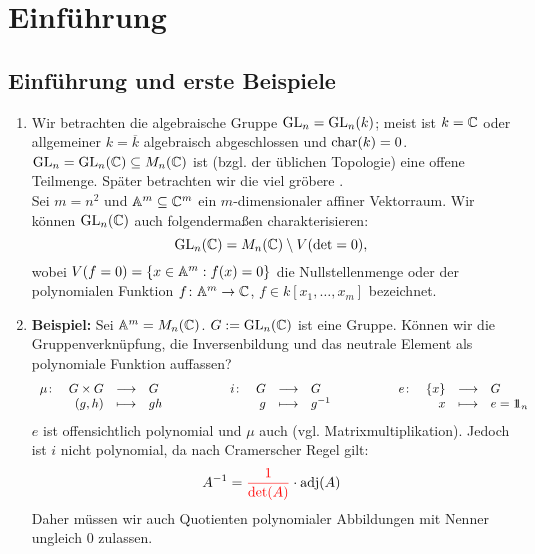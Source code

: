 \setcounter{section}{-1}
\section{Einführung}
\label{sec:para0}
\subsection{Einführung und erste Beispiele}
\label{sub:abschnitt_0.1}
\begin{enumerate}
	\item Wir betrachten die algebraische Gruppe $\operatorname{GL}_n = \operatorname{GL}_n(k)$; meist ist $k = \mathbb{C}$ oder allgemeiner $k = \overline{k}$ algebraisch abgeschlossen und $\operatorname{char}(k) = 0$. $\operatorname{GL}_n = \operatorname{GL}_n(\mathbb{C}) \subseteq M_n(\mathbb{C})$ ist (bzgl. der üblichen Topologie) eine offene Teilmenge. Später betrachten wir die viel gröbere . \\
	Sei $m = n^2$ und $\mathbb{A}^m \subseteq \mathbb{C}^m$ ein $m$-dimensionaler affiner Vektorraum. Wir können $\operatorname{GL}_n(\mathbb{C})$ auch folgendermaßen charakterisieren:
	\[ \operatorname{GL}_n(\mathbb{C}) = M_n(\mathbb{C}) \setminus V(\det = 0), \]
	wobei $V(f = 0) = \{x \in \mathbb{A}^m : f(x) = 0 \}$ die Nullstellenmenge oder  der polynomialen Funktion $f\colon \mathbb{A}^m \rightarrow \mathbb{C}$, $f \in k[x_1,\dots,x_m]$ bezeichnet.
	\item \textbf{Beispiel:} Sei $\mathbb{A}^m = M_n(\mathbb{C})$. $G := \operatorname{GL}_n(\mathbb{C})$ ist eine Gruppe. Können wir die Gruppenverknüpfung, die Inversenbildung und das neutrale Element als polynomiale Funktion auffassen? \setlength{\arraycolsep}{1pt}
	\[ \begin{array}{rrclcrrclcrrcl}
		\mu\colon & G \times G & \longrightarrow & G & \phantom{abstand} & i\colon & G & \longrightarrow & G & \phantom{abstand} & e\colon & \{x\} & \longrightarrow & G \\
		 & (g,h) & \longmapsto & gh & & & g & \longmapsto & g^{-1} & & & x & \longmapsto & e = \ind_n
	\end{array} \]
	$e$ ist offensichtlich polynomial und $\mu$ auch (vgl. Matrixmultiplikation). Jedoch ist $i$ nicht polynomial, da nach Cramerscher Regel gilt: \setlength{\arraycolsep}{3pt}
	\[ A^{-1} = \textcolor{red}{\frac{1}{\det(A)}} \cdot \operatorname{adj}(A) \]
	Daher müssen wir auch Quotienten polynomialer Abbildungen mit Nenner ungleich 0 zulassen.
\end{enumerate}

